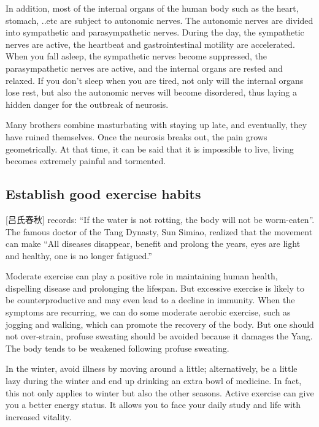 \documentclass[
]{book}
\begin{document}
In addition, most of the internal organs of the human body such as the heart, stomach, ..etc are subject to autonomic nerves. The autonomic nerves are divided into sympathetic and parasympathetic nerves. During the day, the sympathetic nerves are active, the heartbeat and gastrointestinal motility are accelerated. When you fall asleep, the sympathetic nerves become suppressed, the parasympathetic nerves are active, and the internal organs are rested and relaxed. If you don't sleep when you are tired, not only will the internal organs lose rest, but also the autonomic nerves will become disordered, thus laying a hidden danger for the outbreak of neurosis.

Many brothers combine masturbating with staying up late, and eventually, they have ruined themselves. Once the neurosis breaks out, the pain grows geometrically. At that time, it can be said that it is impossible to live, living becomes extremely painful and tormented.

\hypertarget{establish-good-exercise-habits}{%
\subsection{Establish good exercise habits}\label{establish-good-exercise-habits}}

{[}吕氏春秋{]} records: ``If the water is not rotting, the body will not be worm-eaten''. The famous doctor of the Tang Dynasty, Sun Simiao, realized that the movement can make ``All diseases disappear, benefit and prolong the years, eyes are light and healthy, one is no longer fatigued.''

Moderate exercise can play a positive role in maintaining human health, dispelling disease and prolonging the lifespan. But excessive exercise is likely to be counterproductive and may even lead to a decline in immunity. When the symptoms are recurring, we can do some moderate aerobic exercise, such as jogging and walking, which can promote the recovery of the body. But one should not over-strain, profuse sweating should be avoided because it damages the Yang. The body tends to be weakened following profuse sweating.

In the winter, avoid illness by moving around a little; alternatively, be a little lazy during the winter and end up drinking an extra bowl of medicine. In fact, this not only applies to winter but also the other seasons. Active exercise can give you a better energy status. It allows you to face your daily study and life with increased vitality.
\end{document}
